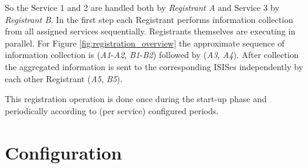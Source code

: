 \documentclass{book}
\begin{document}
So the Service 1 and 2 are handled both by \textit{Registrant A} and Service 3 by \textit{Registrant B}.
In the first step each Registrant performs information collection from all assigned services sequentially. Registrants themselves are executing in parallel. For Figure \ref{fig:registration_overview} the approximate sequence of information collection is (\textit{A1}-\textit{A2}, \textit{B1}-\textit{B2}) followed by (\textit{A3}, \textit{A4}). After collection  the aggregated information is sent to the corresponding ISISes independently by each other Registrant (\textit{A5}, \textit{B5}).

\begin{figure}[ht]
\end{figure}

This registration operation is done once during the start-up phase and periodically according to (per service) configured periods.



\section{Configuration}
\label{sec:service_configuration}





% 
\end{document}
